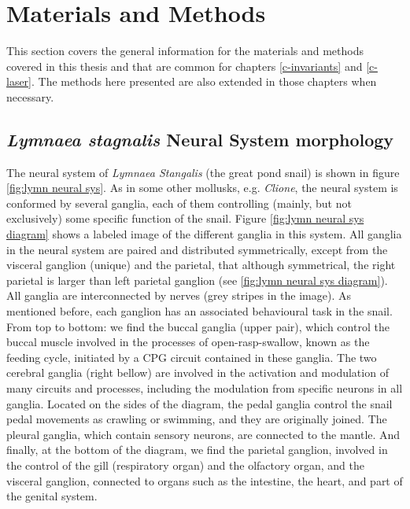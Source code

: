 \chapter{Materials and Methods}
This section covers the general information for the materials and methods covered in this thesis and that are common for chapters \ref{c-invariants} and \ref{c-laser}. The methods here presented are also extended in those chapters when necessary.


\section{\textit{Lymnaea stagnalis} Neural System morphology}
\label{sec:lymnaea morphology}
The neural system of \textit{Lymnaea Stangalis} (the great pond snail) is shown in figure \ref{fig:lymn neural sys}. As in some other mollusks, e.g. {\sl Clione}, the neural system is conformed by several ganglia, each of them controlling (mainly, but not exclusively) some specific function of the snail. Figure \ref{fig:lymn neural sys diagram} shows a labeled image of the different ganglia in this system. All ganglia in the neural system are paired and distributed symmetrically, except from the visceral ganglion (unique) and the parietal, that although symmetrical, the right parietal is larger than left parietal ganglion (see \ref{fig:lymn neural sys diagram}). All ganglia are interconnected by nerves (grey stripes in the image). As mentioned before, each ganglion has an associated behavioural task in the snail. From top to bottom: we find the buccal ganglia (upper pair), which control the buccal muscle involved in the processes of open-rasp-swallow, known as the feeding cycle, initiated by a CPG circuit contained in these ganglia. The two cerebral ganglia (right bellow) are involved in the activation and modulation of many circuits and processes, including the modulation from specific neurons in all ganglia. Located on the sides of the diagram, the pedal ganglia control the snail pedal movements as crawling or swimming, and they are originally joined. The pleural ganglia, which contain sensory neurons, are connected to the mantle. And finally, at the bottom of the diagram, we find the parietal ganglion, involved in the control of the gill (respiratory organ) and the olfactory organ, and the visceral ganglion, connected to organs such as the intestine, the heart, and part of the genital system.



